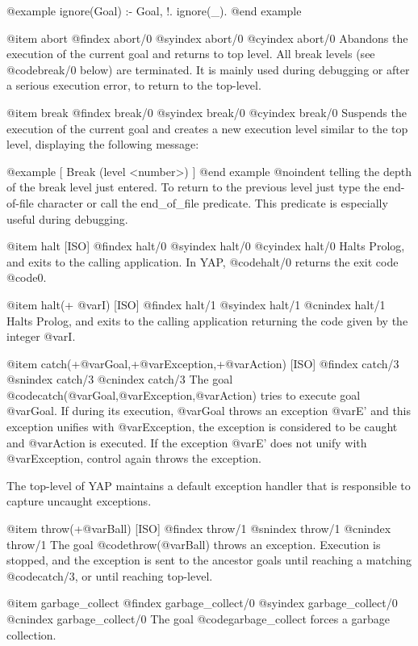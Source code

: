 {{{{@example
ignore(Goal) :-
        Goal, !.
ignore(_).
@end example

@item abort
@findex abort/0
@syindex abort/0
@cyindex abort/0
Abandons the execution of the current goal and returns to top level. All
break levels (see @code{break/0} below) are terminated. It is mainly
used during debugging or after a serious execution error, to return to
the top-level.


@item break
@findex break/0
@syindex break/0
@cyindex break/0
Suspends the execution of the current goal and creates a new execution
level similar to the top level, displaying the following message:

@example
 [ Break (level <number>) ]
@end example
@noindent
telling the depth of the break level just entered. To return to the
previous level just type the end-of-file character or call the
end_of_file predicate.  This predicate is especially useful during
debugging.

@item halt [ISO]
@findex halt/0
@syindex halt/0
@cyindex halt/0
Halts Prolog, and exits to the calling application. In YAP,
@code{halt/0} returns the exit code @code{0}.

@item halt(+ @var{I}) [ISO]
@findex halt/1
@syindex halt/1
@cnindex halt/1
Halts Prolog, and exits to the calling application returning the code
given by the integer @var{I}.

@item catch(+@var{Goal},+@var{Exception},+@var{Action}) [ISO]
@findex catch/3
@snindex catch/3
@cnindex catch/3
The goal @code{catch(@var{Goal},@var{Exception},@var{Action})} tries to
execute goal @var{Goal}. If during its execution, @var{Goal} throws an
exception @var{E'} and this exception unifies with @var{Exception}, the
exception is considered to be caught and @var{Action} is executed. If
the exception @var{E'} does not unify with @var{Exception}, control
again throws the exception.

The top-level of YAP maintains a default exception handler that
is responsible to capture uncaught exceptions.

@item throw(+@var{Ball}) [ISO]
@findex throw/1
@snindex throw/1
@cnindex throw/1
The goal @code{throw(@var{Ball})} throws an exception. Execution is
stopped, and the exception is sent to the ancestor goals until reaching
a matching @code{catch/3}, or until reaching top-level.

@item garbage_collect
@findex garbage_collect/0
@syindex garbage_collect/0
@cnindex garbage_collect/0
The goal @code{garbage_collect} forces a garbage collection.

}}}}
